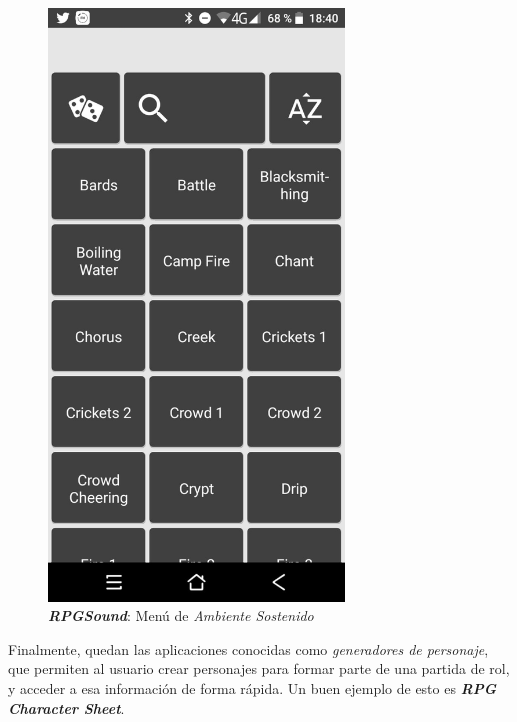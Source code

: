 \begin{figure}[H]
\begin{minipage}{0.3\textwidth}
    \end{minipage} \hspace{2cm}
    \begin{minipage}{0.3\textwidth}
        \centering
        \includegraphics[width=0.7\textwidth]{Images/RPGSound_2.jpeg}
        \caption{\textit{\textbf{RPGSound}}: Menú de \textit{Ambiente 
        Sostenido}}
        
    \end{minipage}
\end{figure}\bigskip

Finalmente, quedan las aplicaciones conocidas como \textit{generadores de
personaje}, que permiten al usuario crear personajes para formar parte de 
una partida de rol, y acceder a esa información de forma rápida. Un buen 
ejemplo de esto es \textit{\textbf{RPG Character Sheet}}.\bigskip

